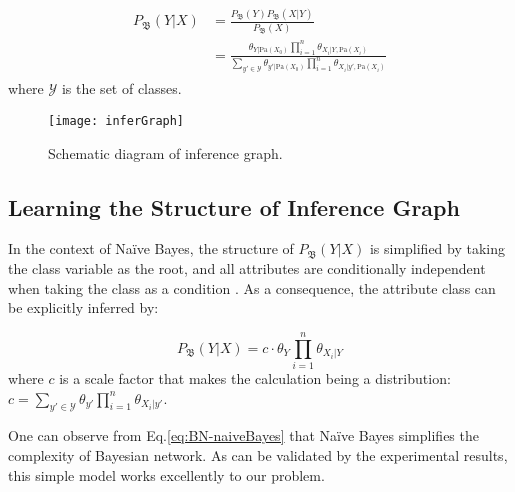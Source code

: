 \vspace{-1ex}
\begin{align}\label{eq:BNWithCls}
\begin{split}
P_\mathfrak{B}(Y|{X}) & = 
\frac{ P_\mathfrak{B}(Y) P_\mathfrak{B}({X}|Y) }{P_\mathfrak{B}({X})}\\
&=\frac{ \theta_{Y|\text{Pa}({X}_0)} \prod_{i=1}^{n} \theta_{X_i|Y, \text{Pa}({X}_i)} }{ \sum_{y'\in \mathcal{Y}} \theta_{y'|\text{Pa}({X}_0)} \prod_{i=1}^{n} \theta_{X_i|y', \text{Pa}({X}_i)} }
\end{split}
\end{align}
where $\mathcal{Y}$ is the set of classes.

\begin{figure}[tb]
\centering
\texttt{[image: inferGraph]}
\caption{Schematic diagram of inference graph.}
\vspace{-4ex}
\label{fig:inferGraphWork}
\end{figure}

\subsection{Learning the Structure of Inference Graph}

In the context of Na\"{i}ve Bayes, 
the structure of $P_\mathfrak{B}(Y|{X})$ is simplified by taking the class variable as the root, and all attributes are conditionally independent when taking the class as a condition \cite{petitjean2018accurate}. As a consequence, the attribute class can be explicitly inferred by:

\begin{equation}\label{eq:BN-naiveBayes}
P_\mathfrak{B}(Y| {X}) = c \cdot \theta_Y \prod_{i=1}^{n}\theta_{X_i|Y}
\end{equation}
where $c$ is a scale factor that makes the calculation being a distribution: $c=\sum_{y'\in \mathcal{Y}}  \theta_{y'} \prod_{i=1}^{n}\theta_{X_i|y'}$.

One can observe from Eq.\eqref{eq:BN-naiveBayes} that Na\"{i}ve Bayes simplifies the complexity of Bayesian network. As can be validated by the experimental results, this simple model works excellently to our problem. 

